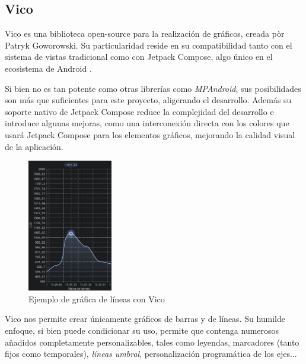         \subsection{Vico}
            
            Vico es una biblioteca open-source para la realización de gráficos, creada pòr Patryk Goworowski. Su 
            particularidad reside en su compatibilidad tanto con el sistema de vistas tradicional como con Jetpack
            Compose, algo único en el ecosistema de Android \cite{goworowski_vico_nodate}.

            Si bien no es tan potente como otras librerías como \textit{MPAndroid}, sus posibilidades son más que 
            suficientes para este proyecto, aligerando el desarrollo. Además su soporte nativo de Jetpack
            Compose reduce la complejidad del desarrollo e introduce algunas mejoras, como una interconexión
            directa con los colores que usará Jetpack Compose para los elementos gráficos, mejorando la calidad visual
            de la aplicación.

            \begin{figure}[h]
                \centering
                \includegraphics[width=0.33\textwidth]{figures/Gráfica de líneas con vico.jpg}
                \caption{Ejemplo de gráfica de líneas con Vico}
                \label{figure:vico:ejemplo_lineas}
            \end{figure}

            Vico nos permite crear únicamente gráficos de barras y de líneas. Su humilde enfoque, si bien puede
            condicionar su uso, permite que contenga numerosos añadidos completamente personalizables, tales como
            leyendas, marcadores (tanto fijos como temporales), \textit{líneas umbral}, personalización programática 
            de los ejes...

